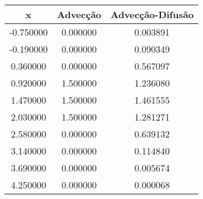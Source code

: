\begin{tabular}{ccc}
\toprule
x & Advecção & Advecção-Difusão \\
\midrule
-0.750000 & 0.000000 & 0.003891 \\
-0.190000 & 0.000000 & 0.090349 \\
0.360000 & 0.000000 & 0.567097 \\
0.920000 & 1.500000 & 1.236080 \\
1.470000 & 1.500000 & 1.461555 \\
2.030000 & 1.500000 & 1.281271 \\
2.580000 & 0.000000 & 0.639132 \\
3.140000 & 0.000000 & 0.114840 \\
3.690000 & 0.000000 & 0.005674 \\
4.250000 & 0.000000 & 0.000068 \\
\bottomrule
\end{tabular}
